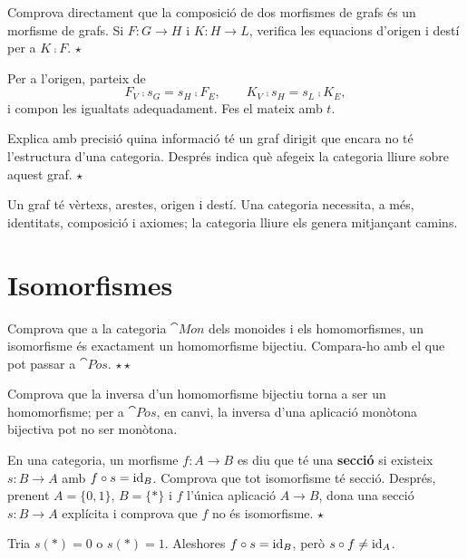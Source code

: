 \begin{exercici}
Comprova directament que la composició de dos morfismes de grafs és un morfisme de grafs. Si $F\colon G\to H$ i $K\colon H\to L$, verifica les equacions d'origen i destí per a $K\comp F$. \hfill{\normalfont$\star$}
\begin{indicacio}
Per a l'origen, parteix de
\[
F_V\comp s_G=s_H\comp F_E,
\qquad
K_V\comp s_H=s_L\comp K_E,
\]
i compon les igualtats adequadament. Fes el mateix amb $t$.
\end{indicacio}
\end{exercici}

\begin{exercici}
Explica amb precisió quina informació té un graf dirigit que encara no té l'estructura d'una categoria. Després indica què afegeix la categoria lliure sobre aquest graf. \hfill{\normalfont$\star$}
\begin{indicacio}
Un graf té vèrtexs, arestes, origen i destí. Una categoria necessita, a més, identitats, composició i axiomes; la categoria lliure els genera mitjançant camins.
\end{indicacio}
\end{exercici}

\section{Isomorfismes}

\begin{exercici}
Comprova que a la categoria $\cat{Mon}$ dels monoides i els homomorfismes, un isomorfisme és exactament un homomorfisme bijectiu. Compara-ho amb el que pot passar a $\cat{Pos}$. \hfill{\normalfont$\star\star$}
\begin{indicacio}
Comprova que la inversa d'un homomorfisme bijectiu torna a ser un homomorfisme; per a $\cat{Pos}$, en canvi, la inversa d'una aplicació monòtona bijectiva pot no ser monòtona.
\end{indicacio}
\end{exercici}

\begin{exercici}
En una categoria, un morfisme $f\colon A\to B$ es diu que té una \textbf{secció} si existeix $s\colon B\to A$ amb $f\circ s=\operatorname{id}_B$. Comprova que tot isomorfisme té secció. Després, prenent $A=\{0,1\}$, $B=\{\ast\}$ i $f$ l'única aplicació $A\to B$, dona una secció $s\colon B\to A$ explícita i comprova que $f$ no és isomorfisme. \hfill{\normalfont$\star$}
\begin{indicacio}
Tria $s(\ast)=0$ o $s(\ast)=1$. Aleshores $f\circ s=\operatorname{id}_B$, però $s\circ f\neq\operatorname{id}_A$.
\end{indicacio}
\end{exercici}

